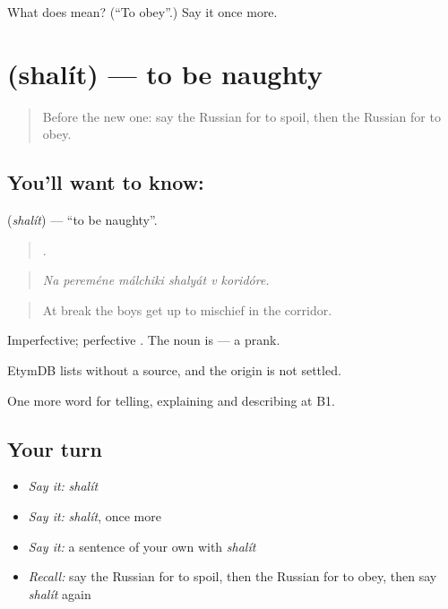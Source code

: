 \begin{tcolorbox}[breakable,colback=teal!4,colframe=teal!35!black,title={Before you move on}]
What does  mean? (\textquotedblleft{}To obey\textquotedblright{}.) Say it once more.
\end{tcolorbox}
\section[\texorpdfstring{\ru{шалить} (shalít)}{шалить (shalít)}]{ (shalít) — to be naughty}

\label{lesson:RU-C497-shalit}



\begin{quote}
Before the new one: say the Russian for to spoil, then the Russian for to obey.
\end{quote}

\subsection*{You'll want to know: }
\textbf{} (\emph{shalít}) — \textquotedblleft{}to be naughty\textquotedblright{}.

\begin{quote}
     .
\end{quote}

\begin{quote}
\emph{Na pereméne málchiki shalyát v koridóre.}
\end{quote}

\begin{quote}
At break the boys get up to mischief in the corridor.
\end{quote}

Imperfective; perfective . The noun is \emph{} — a prank.

\begin{cousinweb}
EtymDB lists \emph{} without a source, and the origin is not settled.
\end{cousinweb}

\begin{grammarlens}[title={What you've built}]
One more word for telling, explaining and describing at B1.
\end{grammarlens}

\subsection*{Your turn}
\begin{itemize}
\raggedright
  \item \emph{Say it:} \emph{shalít}
  \item \emph{Say it:} \emph{shalít}, once more
  \item \emph{Say it:} a sentence of your own with \emph{shalít}
  \item \emph{Recall:} say the Russian for to spoil, then the Russian for to obey, then say \emph{shalít} again
\end{itemize}

